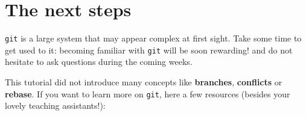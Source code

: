 \documentclass{instructions}
\newcommand{\git}{\texttt{git}\xspace}
\begin{document}
%
%
%
%
%
%

%
%
%
%
%
%
%
%
%
%
%

\part{The next steps}

\git is a large system that may appear complex at first sight. Take some time to
get used to it: becoming familiar with \git will be soon rewarding! and do not
hesitate to ask questions during the coming weeks.

This tutorial did not introduce many concepts like \textbf{branches},
\textbf{conflicts} or \textbf{rebase}. If you want to learn more on \git, here a
few resources (besides your lovely teaching assistants!):
\end{document}
